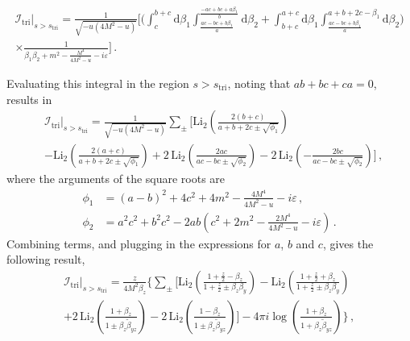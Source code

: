 \documentclass[12pt]{article}
\numberwithin{figure}{section}
\def \nn {\nonumber}
\def \d {\mathrm{d}}
\def \I {\mathcal{I}}
\def \triangle {\mathrm{tri}}
\def \Li {\mathrm{Li}}
\begin{document}
    \begin{multline}
        \I_\triangle \vert_{s>s_\triangle} = \frac{1}{\sqrt{-u \left(4 M^2{-}u\right)}}
        \Big[
        \big(
        \int_{c}^{b+c} \!\!\d \beta_1 \int_{\frac{a c- b c + b \beta_1}{a}}^{\frac{-ac + bc + a \beta_1}{b}}\! \d \beta_2
        +
        \int_{b+c}^{a+c} 
    \!\!\d \beta_1 \int_{\frac{a c- b c + b \beta_1}{a}}^{a+b+2c- \beta_1} \!\d \beta_2
        \big)
        \\
        \times
        \frac{1}{\beta_1  \beta_2 + m^2 - \frac{M^4}{4 M^2-u}- i \varepsilon} \Big]
        \,.
    \end{multline}

    Evaluating this integral in the region $s>s_\triangle$, noting that $ab + bc + ca = 0$, results in
    \begin{align}
        &\mathcal{I}_\triangle \vert_{s>s_\triangle} = \frac{1}{\sqrt{-u (4 M^2-u)}} \sum_{\pm} \bigg[ 
        \Li_2 \left( \frac{2(b+c)}{a+b+2c\pm \sqrt{\phi_1}} \right)
        \\
        &-
         \Li_2 \left( \frac{2(a+c)}{a+b+2c\pm \sqrt{\phi_1}} \right)
        + 2 \, \Li_2 \left( \frac{2 a c}{ac - bc \pm \sqrt{\phi_2}} \right)
        -
        2 \, \Li_2 \left( -\frac{2 b c}{ac - bc \pm \sqrt{\phi_2}} \right)
        \bigg] \,,\nn
    \end{align}
    where the arguments of the square roots are
    \begin{align}
        \phi_1 & = (a-b)^2+4c^2 + 4 m^2 - \frac{4 M^4}{4 M^2-u}- i \varepsilon \,, \\
        \phi_2 & = a^2 c^2 + b^2 c^2 - 2 a b \left(c^2 + 2 m^2 - \frac{2 M^4}{4 M^2-u} - i \varepsilon \right) \,.
    \end{align}
    Combining terms, and plugging in the expressions for $a$, $b$ and $c$, gives the following result,
    \begin{multline}
        \mathcal{I}_\triangle \vert_{s>s_\triangle} = \frac{z}{4 M^2 \beta_z} \Big\{ \sum_{\pm} \Big[  \Li_2 \left( \frac{1 +\frac{z}{2} -\beta_z}{1 + \frac{z}{2} \pm \beta_z \beta_y } \right) - \Li_2 \left( \frac{1 + \frac{z}{2}+\beta_z}{1 + \frac{z}{2} \pm \beta_z \beta_y} \right)
        \\
        +2 \, \Li_2 \left( \frac{1 + \beta_z }{1 \pm \beta_z \tilde \beta_{yz}} \right) - 2 \, \Li_2 \left( \frac{1 - \beta_z}{1 \pm \beta_z \tilde \beta_{yz} } \right) \Big] 
        - 4 \pi i \log \left( \frac{1+\beta_z}{1+\beta_z \tilde \beta_{yz}} \right)\Big\}\,,
    \end{multline}
\end{document}
